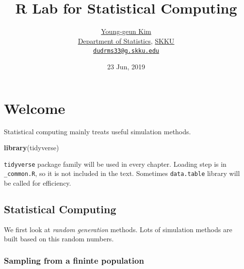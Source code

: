 \documentclass[]{book}
\title{R Lab for Statistical Computing}
\author{\href{https://github.com/ygeunkim}{Young-geun Kim}\\
\href{https://stat.skku.edu/stat/index.jsp}{Department of Statistics}, \href{https://www.skku.edu/skku/index.do}{SKKU}\\
\href{mailto:dudrms33@g.skku.edu}{\nolinkurl{dudrms33@g.skku.edu}}}
\date{23 Jun, 2019}
\newenvironment{Shaded}{\begin{snugshade}}{\end{snugshade}}
\newcommand{\KeywordTok}[1]{\textcolor[rgb]{0.13,0.29,0.53}{\textbf{#1}}}
\newcommand{\NormalTok}[1]{#1}
\let\oldmaketitle\maketitle
\theoremstyle{definition}
\theoremstyle{definition}
\theoremstyle{definition}
\theoremstyle{remark}
\begin{document}
\maketitle

\begin{titlepage}
  
\end{titlepage}

\let\maketitle\oldmaketitle
\maketitle

{
\setcounter{tocdepth}{1}
\tableofcontents
}
\hypertarget{welcome}{%
\chapter*{Welcome}\label{welcome}}

Statistical computing mainly treats useful simulation methods.

\begin{Shaded}
\begin{Highlighting}[]
\KeywordTok{library}\NormalTok{(tidyverse)}
\end{Highlighting}
\end{Shaded}

\texttt{tidyverse} package family will be used in every chapter. Loading step is in \texttt{\_common.R}, so it is not included in the text. Sometimes \texttt{data.table} library will be called for efficiency.

\hypertarget{statistical-computing}{%
\section*{Statistical Computing}\label{statistical-computing}}

We first look at \emph{random generation} methods. Lots of simulation methods are built based on this random numbers.

\hypertarget{sampling-from-a-fininte-population}{%
\subsection*{Sampling from a fininte population}\label{sampling-from-a-fininte-population}}
\end{document}
